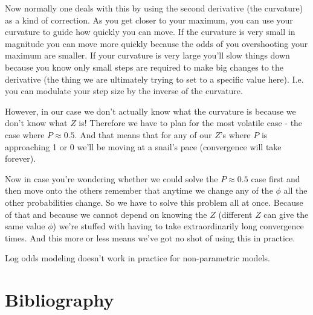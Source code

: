 \documentclass[11pt]{article}
\begin{document}
Now normally one deals with this by using the second derivative (the curvature) as a kind of correction. As you get closer to your maximum, you can use your curvature to guide how quickly you can move. If the curvature is very small in magnitude you can move more quickly because the odds of you overshooting your maximum are smaller. If your curvature is very large you'll slow things down because you know only small steps are required to make big changes to the derivative (the thing we are ultimately trying to set to a specific value here). I.e. you can modulate your step size by the inverse of the curvature. 

However, in our case we don't actually know what the curvature is because we don't know what $Z$ is! Therefore we have to plan for the most volatile case - the case where $P\approx 0.5$. And that means that for any of our $Z$'s where $P$ is approaching 1 or 0 we'll be moving at a snail's pace (convergence will take forever). 

Now in case you're wondering whether we could solve the $P\approx 0.5$ case first and then move onto the others remember that anytime we change any of the $\phi$ all the other probabilities change. So we have to solve this problem all at once. Because of that and because we cannot depend on knowing the $Z$ (different $Z$ can give the same value $\phi$) we're stuffed with having to take extraordinarily long convergence times. And this more or less means we've got no shot of using this in practice. \newline

Log odds modeling doesn't work in practice for non-parametric models. 


\newpage

\section{Bibliography}



\end{document}
